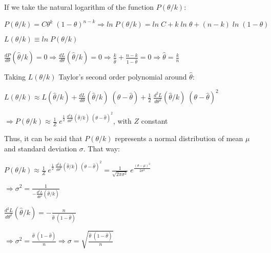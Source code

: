 \documentclass{article}
\begin{document}
\hfill

If we take the natural logarithm of the function $P(\theta/k)$:

\hfill

$P(\theta/k) = C \theta^{k} \; (1 - \theta)^{n - k} \Rightarrow ln \; P(\theta/k) = ln \; C + k \; ln \; \theta + (n - k) \; ln \; (1 - \theta)$

\hfill

$L(\theta/k) \equiv ln \; P(\theta/k)$

\hfill

$\frac{dP}{d\theta} (\hat{\theta}/k) = 0 \Rightarrow \frac{dL}{d\theta} (\hat{\theta}/k) = 0 \Rightarrow \frac{k}{\hat{\theta}} + \frac{n - k}{1 - \hat{\theta}} = 0 \Rightarrow \hat{\theta} = \frac{k}{n}$

\hfill

Taking $L(\theta/k)$ Taylor's second order polynomial around $\hat{\theta}$:

\hfill

$L(\theta/k) \approx L(\hat{\theta}/k) + \frac{dL}{d\theta} (\hat{\theta}/k) \; (\theta - \hat{\theta}) + \frac{1}{2} \; \frac{d^{2}L}{d\theta^{2}} (\hat{\theta}/k) \; (\theta - \hat{\theta})^{2}$

\hfill

$\Rightarrow P(\theta/k) \approx \frac{1}{Z} \; e^{\frac{1}{2} \; \frac{d^{2}L}{d\theta^{2}} (\hat{\theta}/k) \; (\theta - \hat{\theta})^{2}}$, with $Z$ constant

\hfill

Thus, it can be said that $P(\theta/k)$ represents a normal distribution of mean $\mu$ and standard deviation $\sigma$. That way:

\hfill

$P(\theta/k) \approx \frac{1}{Z} \; e^{\frac{1}{2} \; \frac{d^{2}L}{d\theta^{2}} (\hat{\theta}/k) \; (\theta - \hat{\theta})^{2}} = \frac{1}{\sqrt{2 \pi \sigma^{2}}} \; e^{\frac{(\theta - \mu)^{2}}{2 \sigma^{2}}}$

\hfill

$\Rightarrow \sigma^{2} = \frac{1}{-\frac{d^{2}L}{d\theta^{2}} (\hat{\theta}/k)}$

\hfill

$\frac{d^{2}L}{d\theta^{2}} (\hat{\theta}/k) = -\frac{n}{\hat{\theta} \; (1 - \hat{\theta})}$

\hfill

$\Rightarrow \sigma^{2} = \frac{\hat{\theta} \; (1 - \hat{\theta})}{n} \Rightarrow \sigma = \sqrt{\frac{\hat{\theta} \; (1 - \hat{\theta})}{n}}$
\end{document}
